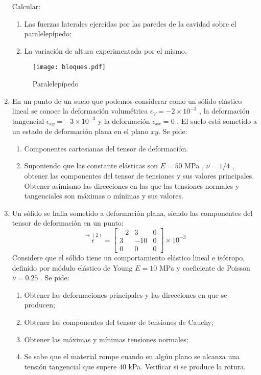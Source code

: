 \documentclass[../notas medios.tex]{subfiles}
\begin{document}
\begin{enumerate}
Calcular:
\begin{enumerate}
\item Las fuerzas laterales ejercidas por las paredes de la cavidad sobre el paralelepípedo;
\item La variación de altura experimentada por el mismo.
\end{enumerate}

\begin{figure}[h]
	\centering
	\texttt{[image: bloques.pdf]}
	\caption{Paralelepípedo}
	\label{bloques}
\end{figure}

\item \label{punto06_m} En un punto de un suelo que podemos considerar como un sólido elástico lineal se conoce la deformación volumétrica $\epsilon_V = -2\times10^{-3}$ , la deformación tangencial $\epsilon_{xy} = - 3 \times 10^{-3}$ y la deformación  $\epsilon_{xx} = 0$ . El suelo está sometido a un estado de deformación plana en el plano $x y$. Se pide:
\begin{enumerate}
\item Componentes cartesianas del tensor de deformación.
\item  Suponiendo que las constante elásticas son $E = 50$ MPa , $\nu =1/4$ , obtener las componentes del tensor de tensiones y sus valores principales. Obtener asimismo las direcciones en las que las tensiones normales y tangenciales son máximas o mínimas y sus valores.
\end{enumerate}

\item \label{punto07_m} Un sólido se halla sometido a deformación plana, siendo las componentes del tensor de deformación en un punto:
\[\overset{\rightarrow (2)}\epsilon = \left[ \begin{array}{ccc}
-2 & 3 & 0 \\
3 & -10 & 0 \\
0 & 0 & 0
\end{array}  \right] \times 10^{-3}\]
Considere que el sólido tiene un comportamiento elástico lineal e isótropo, definido por
módulo elástico de Young $E = 10$ MPa y coeficiente de Poisson $\nu = 0.25$ .
Se pide:
\begin{enumerate}
\item Obtener las deformaciones principales y las direcciones en que se producen;
\item Obtener las componentes del tensor de tensiones de Cauchy;
\item Obtener las máximas y mínimas tensiones normales;
\item Se sabe que el material rompe cuando en algún plano se alcanza una tensión tangencial
que supere $40$ kPa. Verificar si se produce la rotura.
\end{enumerate}


\end{enumerate}
\end{document}
